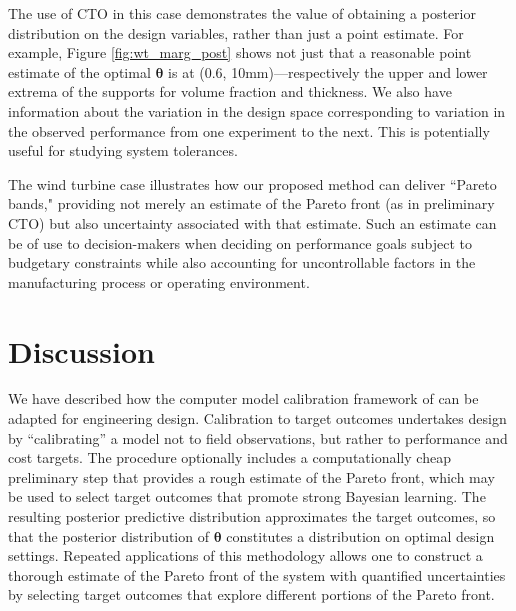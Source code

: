 \documentclass[twocolumn,10pt]{asme2ej}
\begin{document}
%
The use of CTO in this case demonstrates the value of obtaining a posterior distribution on the design variables, rather than just a point estimate.
%
For example, Figure \ref{fig:wt_marg_post} shows not just that a reasonable point estimate of the optimal $\boldsymbol\theta$ is at (0.6, 10mm)---respectively the upper and lower extrema of the supports for volume fraction and thickness. We also have information about the variation in the design space corresponding to variation in the observed performance from one experiment to the next.
%
This is potentially useful for studying system tolerances.
%

The wind turbine case illustrates how our proposed method can deliver ``Pareto bands," providing not merely an estimate of the Pareto front (as in preliminary CTO) but also uncertainty associated with that estimate.
%
Such an estimate can be of use to decision-makers when deciding on performance goals subject to budgetary constraints while also accounting for uncontrollable factors in the manufacturing process or operating environment.



\section{Discussion} \label{conclusion}

We have described how the 
computer model calibration framework of  \cite{Kennedy2001} can be adapted for engineering design. 
%
Calibration to target outcomes undertakes design by ``calibrating'' a model not to field observations, but rather to performance and cost targets. 
%
The procedure optionally includes a computationally cheap preliminary step that provides a rough estimate of the Pareto front, which may be used to select target outcomes that promote strong Bayesian learning.
%
The resulting posterior predictive distribution approximates the target outcomes, so that the posterior distribution of $\boldsymbol\theta$ constitutes a distribution on optimal design settings.
%
Repeated applications of this methodology allows one to construct a thorough estimate of the Pareto front of the system with quantified uncertainties by selecting target outcomes that explore different portions of the Pareto front.
\end{document}
